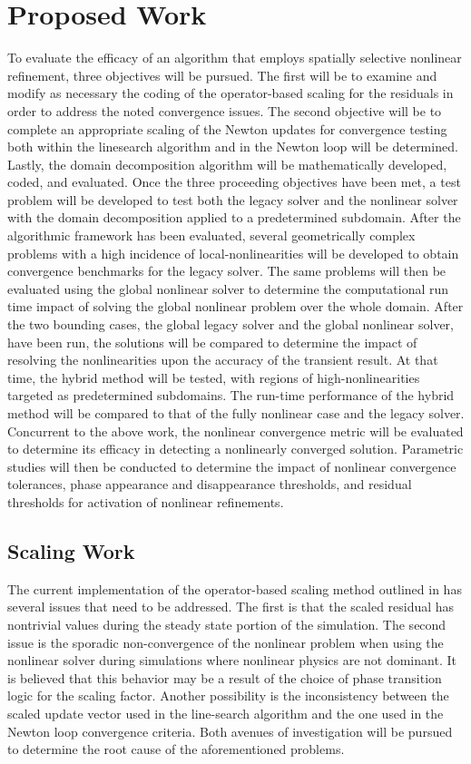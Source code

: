 \chapter{Proposed Work}
\label{chap:proposal}
To evaluate the efficacy of an algorithm that employs  spatially selective nonlinear refinement, three objectives will be pursued.
The first will be to examine and modify as necessary the coding of the operator-based scaling for the residuals in order to address the noted convergence issues.
The second objective will be to complete an appropriate scaling of the Newton updates for convergence testing both within the linesearch algorithm and in the Newton loop will be determined.
Lastly, the domain decomposition algorithm will be mathematically developed, coded, and evaluated.
Once the three proceeding objectives have been met, a test problem will be developed to test both the legacy solver and the nonlinear solver with the domain decomposition applied to a predetermined subdomain.
After the algorithmic framework has been evaluated, several geometrically complex problems with a high incidence of local-nonlinearities will be developed to obtain convergence benchmarks for the legacy solver.
The same problems will then be evaluated using the global nonlinear solver to determine the computational run time impact of solving the global nonlinear problem over the whole domain. 
After the two bounding cases, the global legacy solver and the global nonlinear solver, have been run, the solutions will be compared to determine the impact of resolving the nonlinearities upon the accuracy of the transient result.
At that time, the hybrid method will be tested, with regions of high-nonlinearities targeted as predetermined subdomains.
The run-time performance of the hybrid method will be compared to that of the fully nonlinear case and the legacy solver.
Concurrent to the above work, the nonlinear convergence metric will be evaluated to determine its efficacy in detecting a nonlinearly converged solution.
Parametric studies will then be conducted to determine the impact of nonlinear convergence tolerances, phase appearance and disappearance thresholds, and residual thresholds for activation of nonlinear refinements.

\section{Scaling Work}
\label{sect:proposal_scaling}
The current implementation of the operator-based scaling method outlined in  has several issues that need to be addressed.
The first is that the scaled residual has nontrivial values during the steady state portion of the simulation.
The second issue is the sporadic non-convergence of the nonlinear problem when using the nonlinear solver during simulations where nonlinear physics are not dominant.
It is believed that this behavior may be a result of the choice of phase transition logic for the scaling factor.
Another possibility is the inconsistency between the scaled update vector used in the line-search algorithm and the one used in the Newton loop convergence criteria.
Both avenues of investigation will be pursued to determine the root cause of the aforementioned problems.


